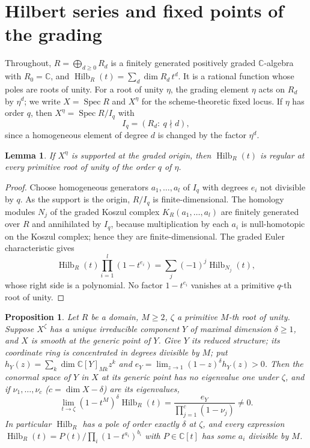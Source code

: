 \documentclass[11pt,a4paper]{article}
\newtheorem{proposition}[theorem]{Proposition}
\newtheorem{lemma}[theorem]{Lemma}
\theoremstyle{definition}
\newcommand{\C}{\mathbb{C}}
\newcommand{\Hilb}{\operatorname{Hilb}}
\newcommand{\Spec}{\operatorname{Spec}}
\begin{document}
\section{Hilbert series and fixed points of the grading}\label{sec:hilbert}

Throughout, $R=\bigoplus_{d\ge0}R_d$ is a finitely generated positively graded
$\C$-algebra with $R_0=\C$, and $\Hilb_R(t)=\sum_d\dim R_d\,t^d$. It is a
rational function whose poles are roots of unity. For a root of unity $\eta$,
the grading element $\eta$ acts on $R_d$ by $\eta^d$; we write $X=\Spec R$ and
$X^\eta$ for the scheme-theoretic fixed locus. If $\eta$ has order $q$, then
$X^\eta=\Spec R/I_q$ with
\begin{equation}\label{eq:fixedideal}
 I_q=(R_d:\ q\nmid d),
\end{equation}
since a homogeneous element of degree $d$ is changed by the factor $\eta^d$.

\begin{lemma}\label{lem:isolated}
If $X^\eta$ is supported at the graded origin, then $\Hilb_R(t)$ is regular at
every primitive root of unity of the order $q$ of $\eta$.
\end{lemma}

\begin{proof}
Choose homogeneous generators $a_1,\dots,a_l$ of $I_q$ with degrees $e_i$ not
divisible by $q$. As the support is the origin, $R/I_q$ is finite-dimensional.
The homology modules $N_j$ of the graded Koszul complex $K_R(a_1,\dots,a_l)$
are finitely generated over $R$ and annihilated by $I_q$, because
multiplication by each $a_i$ is null-homotopic on the Koszul complex; hence
they are finite-dimensional. The graded Euler characteristic gives
\[
 \Hilb_R(t)\prod_{i=1}^l(1-t^{e_i})=\sum_j(-1)^j\Hilb_{N_j}(t),
\]
whose right side is a polynomial. No factor $1-t^{e_i}$ vanishes at a
primitive $q$-th root of unity.
\end{proof}

\begin{proposition}\label{prop:fixedcomponentpole}
Let $R$ be a domain, $M\ge2$, $\zeta$ a primitive $M$-th root of unity. Suppose
$X^\zeta$ has a unique irreducible component $Y$ of maximal dimension
$\delta\ge1$, and $X$ is smooth at the generic point of $Y$. Give $Y$ its
reduced structure; its coordinate ring is concentrated in degrees divisible
by $M$; put $h_Y(z)=\sum_k\dim\C[Y]_{Mk}z^k$ and
$e_Y=\lim_{z\to1}(1-z)^\delta h_Y(z)>0$. Then the conormal space of $Y$ in $X$
at its generic point has no eigenvalue one under $\zeta$, and if
$\nu_1,\dots,\nu_c$ ($c=\dim X-\delta$) are its eigenvalues,
\begin{equation}\label{eq:residue}
 \lim_{t\to\zeta}(1-t^M)^\delta\Hilb_R(t)=\frac{e_Y}{\prod_{j=1}^c(1-\nu_j)}\ne0 .
\end{equation}
In particular $\Hilb_R$ has a pole of order exactly $\delta$ at $\zeta$, and
every expression $\Hilb_R(t)=P(t)/\prod_i(1-t^{a_i})^{b_i}$ with $P\in\C[t]$
has some $a_i$ divisible by $M$.
\end{proposition}
\end{document}
